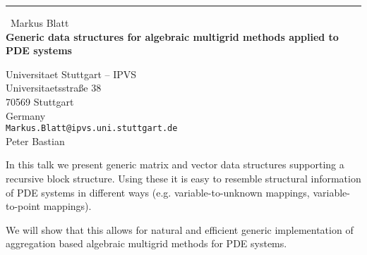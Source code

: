 \documentclass{report}
\begin{document}
\begin{center}
\rule{6in}{1pt} \
{\large Markus Blatt \\
{\bf Generic data structures for algebraic multigrid methods applied to PDE systems}}

Universitaet Stuttgart – IPVS \\ Universitaetsstraße 38 \\ 70569 Stuttgart \\ Germany
\\
{\tt Markus.Blatt@ipvs.uni.stuttgart.de}\\
Peter Bastian\end{center}

In this talk we present generic matrix and vector data structures
supporting a recursive block structure. Using these it is easy to
resemble structural information of PDE systems in different ways
(e.g. variable-to-unknown mappings, variable-to-point mappings).

We will show that this allows for natural and efficient generic
implementation of aggregation based algebraic multigrid methods for PDE
systems.
\end{document}
